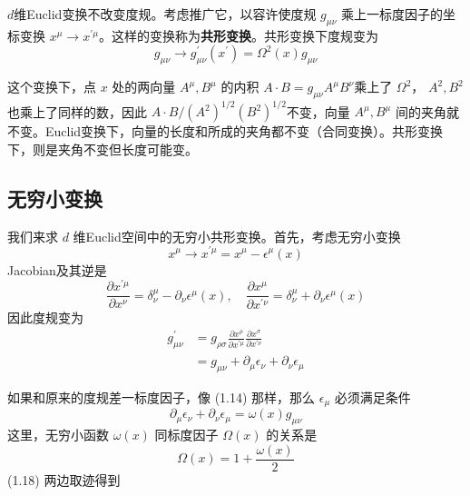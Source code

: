 $d $维Euclid变换不改变度规。考虑推广它，以容许使度规 $g_{\mu\nu}$ 乘上一标度因子的坐标变换 $x^{\mu} \rightarrow x^{\prime \mu} $。这样的变换称为\textbf{共形变换}。共形变换下度规变为
\begin{equation}
	g_{\mu \nu} \rightarrow g_{\mu \nu}^{\prime}\left(x^{\prime}\right)=\Omega^{2}(x) g_{\mu \nu}
\end{equation}


这个变换下，点 $x$ 处的两向量 $A^\mu,B^\mu$ 的内积 $A \cdot B=g_{\mu \nu} A^{\mu} B^{\nu} $乘上了 $\Omega^2 $， $A^2,B^2$ 也乘上了同样的数，因此 $A \cdot B /\left(A^{2}\right)^{1 / 2}\left(B^{2}\right)^{1 / 2} $不变，向量 $A^\mu,B^\mu$ 间的夹角就不变。Euclid变换下，向量的长度和所成的夹角都不变（合同变换）。共形变换下，则是夹角不变但长度可能变。

\subsection{无穷小变换}

我们来求 $d$ 维Euclid空间中的无穷小共形变换。首先，考虑无穷小变换
\begin{equation}
	x^{\mu} \rightarrow x^{\prime \mu}=x^{\mu}-\epsilon^{\mu}(x)
\end{equation}
Jacobian及其逆是
\begin{equation}
	\frac{\partial x^{\prime \mu}}{\partial x^{\nu}}=\delta_{\nu}^{\mu}-\partial_{\nu} \epsilon^{\mu}(x), \quad \frac{\partial x^{\mu}}{\partial x^{\prime \nu}}=\delta_{\nu}^{\mu}+\partial_{\nu} \epsilon^{\mu}(x)
\end{equation}
因此度规变为
\begin{equation}
	\begin{aligned} g_{\mu \nu}^{\prime}&=g_{\rho \sigma} \frac{\partial x^{\rho}}{\partial x^{\prime \mu}} \frac{\partial x^{\sigma}}{\partial x^{\prime \nu}}\\ &=g_{\mu \nu}+\partial_{\mu} \epsilon_{\nu}+\partial_{\nu} \epsilon_{\mu} \end{aligned}
\end{equation}


如果和原来的度规差一标度因子，像 (1.14) 那样，那么 $\epsilon_\mu$ 必须满足条件
\begin{equation}
	\partial_{\mu}\epsilon_{\nu}+\partial_{\nu}\epsilon_{\mu}=\omega(x) g_{\mu \nu}
\end{equation}
这里，无穷小函数 $\omega(x)$ 同标度因子 $\Omega(x)$ 的关系是
\begin{equation}
	\Omega(x)=1+\frac{\omega(x)}{2}
\end{equation}
(1.18) 两边取迹得到

